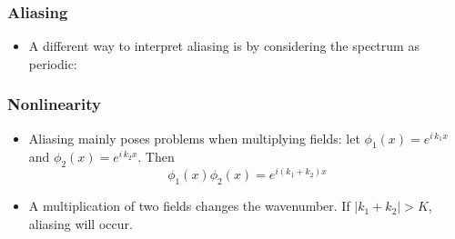 \documentclass[aspectratio=43,9pt]{beamer}
\begin{document}
%
\begin{frame}
	\frametitle{Aliasing}
	\vfill\begin{itemize}
		\item A different way to interpret aliasing is by considering the spectrum as periodic:
			\begin{center}
				\only<2>{\scalebox{.7}{\small}}%
				\only<3->{\scalebox{.7}{\small}}%
			\end{center}\vfill
	\end{itemize}\vfill
\end{frame}
%
%
\begin{frame}
	\frametitle{Nonlinearity}
	\vfill\begin{itemize}
		\item Aliasing mainly poses problems when multiplying fields: let $\phi_1(x)=e^{i\,k_1 x}$ and $\phi_2(x)=e^{i\,k_2 x}$. Then
			\begin{equation*}
				\phi_1(x) \phi_2(x) = e^{i(k_1+k_2) x}
			\end{equation*}\vfill
		\item A multiplication of two fields changes the wavenumber. If $|k_1+k_2|>K$, aliasing will occur.
	\end{itemize}\vfill
\end{frame}
%
%
\end{document}
